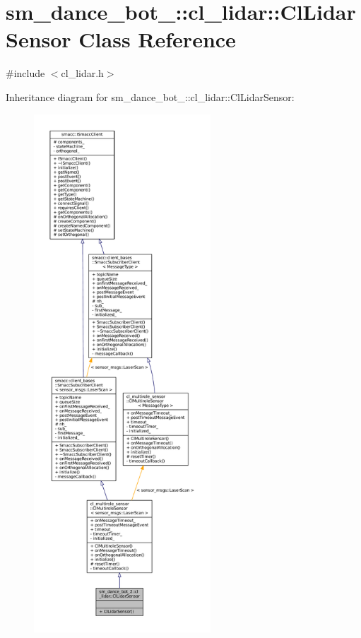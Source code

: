 \hypertarget{classsm__dance__bot__2_1_1cl__lidar_1_1ClLidarSensor}{}\section{sm\+\_\+dance\+\_\+bot\+\_\+:\+:cl\+\_\+lidar\+:\+:Cl\+Lidar\+Sensor Class Reference}
\label{classsm__dance__bot__2_1_1cl__lidar_1_1ClLidarSensor}


{\ttfamily \#include $<$cl\+\_\+lidar.\+h$>$}



Inheritance diagram for sm\+\_\+dance\+\_\+bot\+\_\+:\+:cl\+\_\+lidar\+:\+:Cl\+Lidar\+Sensor\+:
\nopagebreak
\begin{figure}[H]
\begin{center}
\leavevmode
\includegraphics[height=550pt]{classsm__dance__bot__2_1_1cl__lidar_1_1ClLidarSensor__inherit__graph}
\end{center}
\end{figure}


